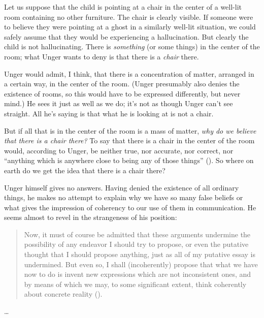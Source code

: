 \documentclass[11pt]{standalone} \newif\ifstandlone \standalonetrue
\newenvironment{squote}{%
	\begin{quote}\begin{singlespace}%
	}{%
	\end{singlespace}\end{quote}}
\begin{document}
\begin{spacing}{1.5}
Let us suppose that the child is pointing at a chair in the center of
a well-lit room containing no other furniture.  The chair is clearly
visible.  If someone were to believe they were pointing at a ghost in
a similarly well-lit situation, we could safely assume that they would
be experiencing a hallucination.  But clearly the child is not
hallucinating.  There is {\em something} (or some things) in the
center of the room; what Unger wants to deny is that there is a {\em
  chair} there.

Unger would admit, I think, that there is a concentration of matter,
arranged in a certain way, in the center of the room.  (Unger
presumably also denies the existence of rooms, so this would have to
be expressed differently, but never mind.)  He sees it just as well
as we do; it's not as though Unger can't see straight.  All he's
saying is that what he is looking at is not a chair.

But if all that is in the center of the room is a mass of matter, {\em
  why do we believe that there is a chair there?}  To say that there
is a chair in the center of the room would, according to Unger, be
neither true, nor accurate, nor correct, nor ``anything which is
anywhere close to being any of those things''
(\citeyear[148]{unger1979}).  So where on earth do we get the idea
that there is a chair there?

Unger himself gives no answers.  Having denied the existence of all
ordinary things, he makes no attempt to explain why we have so many
false beliefs or what gives the impression of coherency to our use of
them in communication.  He seems almost to revel in the strangeness of
his position:

\begin{squote}
Now, it must of course be admitted that these arguments
undermine the possibility of any endeavor I should try to propose, or
even the putative thought that I should propose anything, just as all
of my putative essay is undermined.  But even so, I shall
(incoherently) propose that what we have now to do is invent new
expressions which are not inconsistent ones, and by means of which we
may, to some significant extent, think coherently about concrete
reality (\citeyear[544]{unger1980b}).
\end{squote}

\ldots

\ifstandalone


\end{spacing}
\fi
\end{document}
